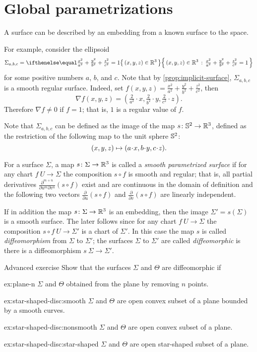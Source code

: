 \section{Global parametrizations} 
A surface can be described by an embedding from a known surface to the space.

For example, consider the ellipsoid
\[\Sigma_{a,b,c}=\set{(x,y,z)\in\RR^3}{\tfrac{x^2}{a^2}+\tfrac{y^2}{b^2}+\tfrac{z^2}{c^2}=1}\]
for some positive numbers $a$, $b$, and $c$.
Note that by \ref{prop:implicit-surface}, $\Sigma_{a,b,c}$ is a smooth regular surface.
Indeed, set $f(x,y,z)=\tfrac{x^2}{a^2}+\tfrac{y^2}{b^2}+\tfrac{z^2}{c^2}$,
then
\[\nabla f(x,y,z)=(\tfrac{2}{a^2}\cdot x,\tfrac{2}{b^2}\cdot y,\tfrac{2}{c^2}\cdot z).\]
Therefore $\nabla f\ne0$ if $f=1$; that is, $1$ is a regular value of $f$.

Note that $\Sigma_{a,b,c}$ can be defined as the image of the map $s\colon\mathbb{S}^2\to\mathbb{R}^3$, defined as the restriction of the following map to the unit sphere $\mathbb{S}^2$:
\[(x,y,z)\z\mapsto (a\cdot x, b\cdot y,c\cdot z).\]

For a surface $\Sigma$, a map $s\colon \Sigma \to \mathbb{R} ^3$ is called a 
\emph{smooth parametrized surface} if for any chart $f\:U\to \Sigma$ 
the composition $s\circ f$ is smooth and regular;
that is, all partial derivatives $\frac{\partial^{m+n}}{\partial u^m\partial v^n}(s\circ f)$ exist and are continuous in the domain of definition and the following two vectors 
$\frac{\partial}{\partial u}(s\circ f)$ and $\frac{\partial}{\partial v}(s\circ f)$ are linearly independent.

If in addition the map $s\colon \Sigma \to \mathbb{R} ^3$ is an embedding, then the image $\Sigma'=s(\Sigma)$ is a smooth surface.
The later follows since for any chart $f\:U\to \Sigma$ the composition $s\circ f\:U\to \Sigma'$ is a chart of $\Sigma'$. 
In this case the map $s$ is called \emph{diffeomorphism} from $\Sigma$ to $\Sigma'$; the surfaces $\Sigma$ to $\Sigma'$ are called \emph{diffeomorphic} is there is a diffeomorphism $s\:\Sigma\to\Sigma'$.


\begin{thm}{Advanced exercise}\label{ex:star-shaped-disc}
Show that the surfaces $\Sigma$ and $\Theta$ are diffeomorphic if

\begin{subthm}{ex:plane-n}
$\Sigma$ and $\Theta$ obtained from the plane by removing $n$ points.
\end{subthm}


\begin{subthm}{ex:star-shaped-disc:smooth}
$\Sigma$ and $\Theta$ are open convex subset of a plane bounded by a smooth curves.
\end{subthm}


\begin{subthm}{ex:star-shaped-disc:nonsmooth}
$\Sigma$ and $\Theta$ are open convex subset of a plane.
\end{subthm}

\begin{subthm}{ex:star-shaped-disc:star-shaped}
$\Sigma$ and $\Theta$ are open star-shaped subset of a plane.
\end{subthm}
\end{thm}


